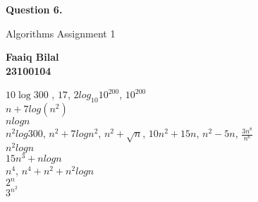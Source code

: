 \documentclass[]{article}
\begin{document}
\begin{center}
    \vspace*{1cm}

    \textbf{Question 6.}

    \vspace{0.5cm}
     Algorithms Assignment 1

    \vspace{0.15cm}

    \textbf{Faaiq Bilal} \\ 
    \textbf{23100104}
         
\end{center}

$10 \log 300 $ , $17$, $2log_{10} 10^{200}$, $10^{200}$ \\
$ n + 7 log(n^2) $ \\
$ n log n$ \\
$ n^2 log 300 $, $n^2 + 7 log n^2$, $n^2 + \sqrt{n}$, $10n^2 + 15n$, $n^2-5n$, $ \frac{3n^8}{n^6} $ \\
$ n^2 log n$ \\
$ 15 n^3 + n log n $ \\
$ n^4 $, $n^4 + n^2 + n^2 log n$ \\
$ 2^n$ \\
$3^{n^2}$
\end{document}
